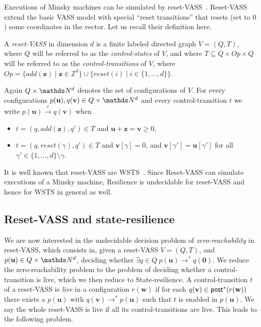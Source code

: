 Executions of Minsky machines can be simulated by reset-VASS~\cite{araki1976PN}. 
Reset-VASS extend the basic VASS model with special “reset
transitions” that resets (set to $0$) some coordinates in the vector. Let us recall their definition here.
\begin{definition}
A {\em reset-VASS} in dimension $d$ %
 is a finite 
labeled directed graph $V = (Q,T)$, where $Q$ will be referred to as the {\em control-states} of $V$, and where 
$T \subseteq Q \times Op \times Q$
 will be referred to as the {\em control-transitions} of $V$,
where $Op = \{ add(\textbf{z}) \mid \textbf{z} \in \mathds{Z}^d\} \cup 
		\{ reset(i) \mid i \in \{1,\ldots,d\} \}$.
\end{definition}

Again $Q \times \N^d$
 denotes the set of configurations of $V$.
For every configurations $p(\textbf{u}), q(\textbf{v}) \in Q \times \N^d$ and every control-transition $t$ we write
$p(\textbf{u}) \xrightarrow{t} q(\textbf{v})$ when 
\begin{samepage}\begin{itemize}
\item  $t = (q,add(\textbf{z}),q') \in T$
and $\textbf{u}+\textbf{z} = \textbf{v} \geq 0$,
\item $t = (q,reset(\gamma),q') \in T$ 
and
$\textbf{v}[\gamma] = 0$, and $\textbf{v}[\gamma'] = \textbf{u}[\gamma']$ for all $\gamma' \in \{1,\ldots, d\} \setminus \gamma$.
\end{itemize} \end{samepage}

It is well known that reset-VASS are WSTS~\cite{dufourd1998reset}. 
Since Reset-VASS can simulate executions of a Minsky machine, {\sc Resilience} is undecidable for reset-VASS and hence for WSTS in general as well.


\subsection{Reset-VASS and state-resilience}\label{appendix}

We are now interested in the 
 undecidable \cite{araki1976PN} decision problem of {\em zero-reachability} in reset-VASS, which consists in, given a
reset-VASS $V=(Q,T)$, and $p(\textbf{u}) \in Q \times \N^d$,
deciding whether $\exists q \in Q ~ p(\textbf{u}) \to^* q(\textbf{0})$.
%
We reduce the zero-reachability problem to the problem of deciding whether a control-transition is live,
which we then reduce to {\sc State-resilience}.
A control-transition $t$ of a reset-VASS is {\em live} in a configuration $r(\textbf{w})$ if for each $q(\textbf{v}) \in \textsf{post}^*(r(\textbf{w}))$ there exists a 
 $p(\textbf{u})$ with $q(\textbf{v}) \to^* p(\textbf{u})$ such that $t$ is enabled in $p(\textbf{u})$. We say the whole reset-VASS is live if all its control-transitions are
live. This leads to the following problem.

